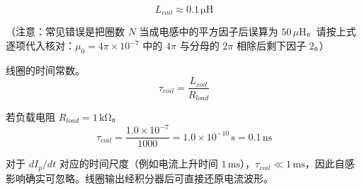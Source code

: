 \[
    \boxed{L_{coil} \approx 0.1\,\mathrm{\mu H}}
\]

（注意：常见错误是把圈数 $N$ 当成电感中的平方因子后误算为 $50\,\mu\mathrm{H}$。请按上式逐项代入核对：$\mu_0=4\pi\times10^{-7}$ 中的 $4\pi$ 与分母的 $2\pi$ 相除后剩下因子 $2$。）

线圈的时间常数。
\[
    \tau_{coil} = \frac{L_{coil}}{R_{load}}
\]

若负载电阻 $R_{load}=1\,\mathrm{k\Omega}$。
\[
    \tau_{coil} = \frac{1.0\times10^{-7}}{1000} = 1.0\times10^{-10}\,\mathrm{s} = 0.1\,\mathrm{ns}
\]

对于 $dI_p/dt$ 对应的时间尺度（例如电流上升时间 $1\,\mathrm{ms}$），$\tau_{coil} \ll 1\,\mathrm{ms}$，因此自感影响确实可忽略。线圈输出经积分器后可直接还原电流波形。


